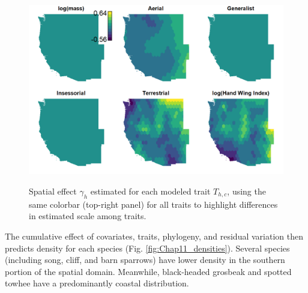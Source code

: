 \begin{figure}[!ht]
    \caption[Spatial trait responses for bird species]{Spatial effect \(\gamma_{h}\) estimated for each modeled trait \(T_{h,c}\), using the same colorbar (top-right panel) for all traits to highlight differences in estimated scale among traits.}
    \includegraphics[width=5.5in]{Chap_11/Traits-responses.png}
    \label{fig:Chap11_trait_responses}
\end{figure}

The cumulative effect of covariates, traits, phylogeny, and residual variation then predicts density for each species (Fig. \ref{fig:Chap11_densities}).  Several species (including song, cliff, and barn sparrows) have lower density in the southern portion of the spatial domain.  Meanwhile, black-headed grosbeak and spotted towhee have a predominantly coastal distribution.   

